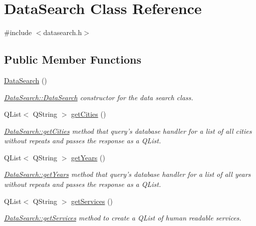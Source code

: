 \hypertarget{class_data_search}{\section{Data\-Search Class Reference}
\label{class_data_search}
}


{\ttfamily \#include $<$datasearch.\-h$>$}

\subsection*{Public Member Functions}
\begin{DoxyCompactItemize}
\item 
\hyperlink{class_data_search_aa889d58bfc809bce710b2a7bfec5c365}{Data\-Search} ()
\begin{DoxyCompactList}\small\item\em \hyperlink{class_data_search_aa889d58bfc809bce710b2a7bfec5c365}{Data\-Search\-::\-Data\-Search} constructor for the data search class. \end{DoxyCompactList}\item 
Q\-List$<$ Q\-String $>$ \hyperlink{class_data_search_a9cebb22e5b84c7f665fa2b597aa3bf76}{get\-Cities} ()
\begin{DoxyCompactList}\small\item\em \hyperlink{class_data_search_a9cebb22e5b84c7f665fa2b597aa3bf76}{Data\-Search\-::get\-Cities} method that query's database handler for a list of all cities without repeats and passes the response as a Q\-List. \end{DoxyCompactList}\item 
Q\-List$<$ Q\-String $>$ \hyperlink{class_data_search_afc4442612d6c9db33e09b902b8e4c2b6}{get\-Years} ()
\begin{DoxyCompactList}\small\item\em \hyperlink{class_data_search_afc4442612d6c9db33e09b902b8e4c2b6}{Data\-Search\-::get\-Years} method that query's database handler for a list of all years without repeats and passes the response as a Q\-List. \end{DoxyCompactList}\item 
Q\-List$<$ Q\-String $>$ \hyperlink{class_data_search_aeb4f2d34c2018370cf3bf3b735758483}{get\-Services} ()
\begin{DoxyCompactList}\small\item\em \hyperlink{class_data_search_aeb4f2d34c2018370cf3bf3b735758483}{Data\-Search\-::get\-Services} method to create a Q\-List of human readable services. \end{DoxyCompactList}\item 

\end{DoxyCompactItemize}
